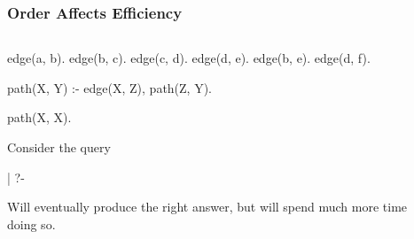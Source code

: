 \documentclass{plt}
\begin{document}
\begin{frame}[t,fragile=singleslide]
  \frametitle{Order Affects Efficiency}

\begin{columns}
  \begin{column}[t]{0.4\textwidth}

\begin{prolog}
edge(a, b). edge(b, c).
edge(c, d). edge(d, e).
edge(b, e). edge(d, f).

path(X, Y) :-
    edge(X, Z), path(Z, Y).

path(X, X).
\end{prolog}

Consider the query

\begin{interactive}
| ?- 
\end{interactive}

Will eventually produce the right answer, but will spend much more
time doing so.

  \end{column}
\begin{column}[t]{0.5\textwidth}


\end{column}
\end{columns}

\end{frame}
\end{document}

